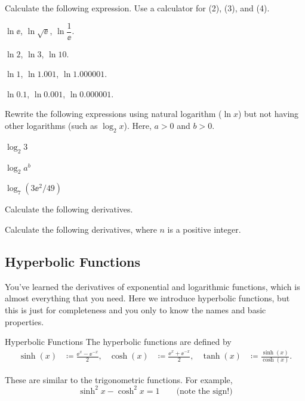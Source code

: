 \documentclass[11pt,pdfa,lastpage]{MishoNote}
\begin{document}
\begin{enumerate}[resume]
 \itemA Calculate the following expression. Use a calculator for (2), (3), and (4).
 \begin{menumerate}{2}
\item $\ln \ee$, $\ln \sqrt{\ee}$, $\ln \dfrac{1}{\ee}$.
\item $\ln 2$, $\ln 3$, $\ln 10$.
\item $\ln 1$, $\ln 1.001$, $\ln 1.000001$.
\item $\ln 0.1$, $\ln 0.001$, $\ln 0.000001$.
 \end{menumerate}
\itemB Rewrite the following expressions using natural logarithm ($\ln x$) but not having other logarithms (such as $\log_2 x$). Here, $a>0$ and $b>0$.
\begin{menumerate}{3}
  \item $\log_2 3$
  \item $\log_2a^b$
  \item $\log_7(3\ee^2/49)$
\end{menumerate}
  \itemS Calculate the following derivatives.
  \begin{menumerate}{4}
  \end{menumerate}
  \itemB Calculate the following derivatives, where $n$ is a positive integer.
  \begin{menumerate}{3}
\end{menumerate}
\end{enumerate}

\newpage

\subsection{Hyperbolic Functions}
You've learned the derivatives of exponential and logarithmic functions, which is almost everything that you need.
Here we introduce hyperbolic functions, but this is just for completeness and you only to know the names and basic properties.
\begin{definition}{Hyperbolic Functions}{}
  The hyperbolic functions are defined by
  \begin{align}
    \sinh(x) &\coloneq \frac{\ee^x-\ee^{-x}}{2},&
    \cosh(x) &\coloneq \frac{\ee^x+\ee^{-x}}{2},&
    \tanh(x) &\coloneq \frac{\sinh(x)}{\cosh(x)}.
  \end{align}
\end{definition}
These are similar to the trigonometric functions. For example,
\[ \sinh^2x-\cosh^2x=1 \qquad\text{(note the sign!)} \]
\end{document}
